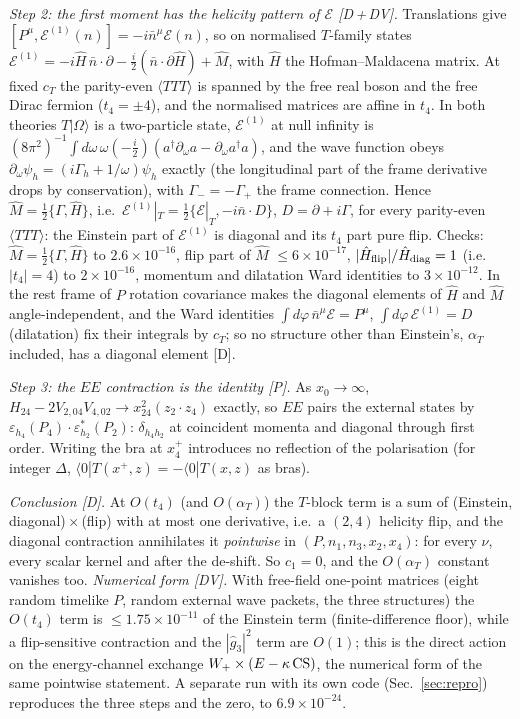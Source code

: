 \documentclass[aps,prl,onecolumn,superscriptaddress,nofootinbib]{revtex4-2}
\begin{document}
\emph{Step 2: the first moment has the helicity pattern of $\mathcal E$ [D\,+\,DV].} Translations give
$[P^\mu,\mathcal E^{(1)}(n)]=-i\bar n^\mu\mathcal E(n)$, so on normalised $T$-family states
$\mathcal E^{(1)}=-i\hat H\,\bar n\cdot\partial-\tfrac i2(\bar n\cdot\partial\hat H)+\hat M$, with $\hat H$ the Hofman--Maldacena matrix.
At fixed $c_T$ the parity-even $\langle TTT\rangle$ is spanned by the free real boson and the free Dirac fermion ($t_4=\pm4$), and the
normalised matrices are affine in $t_4$. In both theories $T|\Omega\rangle$ is a two-particle state, $\mathcal E^{(1)}$ at null
infinity is $(8\pi^2)^{-1}\int d\omega\,\omega(-\tfrac i2)(a^\dagger\partial_\omega a-\partial_\omega a^\dagger a)$, and the
wave function obeys $\partial_\omega\psi_h=(i\Gamma_h+1/\omega)\psi_h$ exactly (the longitudinal part of the frame derivative drops by
conservation), with $\Gamma_-=-\Gamma_+$ the frame connection. Hence $\hat M=\tfrac12\{\Gamma,\hat H\}$, i.e.\
$\mathcal E^{(1)}|_T=\tfrac12\{\mathcal E|_T,-i\bar n\cdot D\}$, $D=\partial+i\Gamma$, for every parity-even $\langle TTT\rangle$: the
Einstein part of $\mathcal E^{(1)}$ is diagonal and its $t_4$ part pure flip. Checks: $\hat M=\tfrac12\{\Gamma,\hat H\}$ to
$2.6\times10^{-16}$, flip part of $\hat M$ $\le6\times10^{-17}$, $|\hat H_{\rm flip}|/\hat H_{\rm diag}=1$ (i.e.\ $|t_4|=4$) to
$2\times10^{-16}$, momentum and dilatation Ward identities to $3\times10^{-12}$. In the rest frame of $P$ rotation covariance makes the
diagonal elements of $\hat H$ and $\hat M$ angle-independent, and the Ward identities $\int d\varphi\,\bar n^\mu\mathcal E=P^\mu$,
$\int d\varphi\,\mathcal E^{(1)}=D$ (dilatation) fix their integrals by $c_T$; so no structure other than Einstein's, $\alpha_T$
included, has a diagonal element [D].

\emph{Step 3: the $EE$ contraction is the identity [P].} As $x_0\to\infty$, $H_{24}-2V_{2,04}V_{4,02}\to x_{24}^2(z_2\cdot z_4)$
exactly, so $EE$ pairs the external states by $\varepsilon_{h_4}(P_4)\cdot\varepsilon^*_{h_2}(P_2)$: $\delta_{h_4h_2}$ at coincident
momenta and diagonal through first order. Writing the bra at $x_4^+$ introduces no reflection of the polarisation (for integer
$\Delta$, $\langle0|T(x^+,z)=-\langle0|T(x,z)$ as bras).

\emph{Conclusion [D].} At $O(t_4)$ (and $O(\alpha_T)$) the $T$-block term is a sum of (Einstein, diagonal)\,$\times$\,(flip) with at
most one derivative, i.e.\ a $(2,4)$ helicity flip, and the diagonal contraction annihilates it \emph{pointwise} in
$(P,n_1,n_3,x_2,x_4)$: for every $\nu$, every scalar kernel and after the de-shift. So $c_1=0$, and the $O(\alpha_T)$ constant
vanishes too. \emph{Numerical form [DV].} With free-field one-point matrices (eight random timelike $P$, random external wave packets,
the three structures) the $O(t_4)$ term is $\le1.75\times10^{-11}$ of the Einstein term (finite-difference floor), while a
flip-sensitive contraction and the $|\hat g_3|^2$ term are $O(1)$; this is the direct action on the energy-channel exchange
$W_+\times(E-\kappa\,{\rm CS})$, the numerical form of the same pointwise statement. A separate run with its own code (Sec.~\ref{sec:repro}) reproduces
the three steps and the zero, to $6.9\times10^{-24}$.
\end{document}
